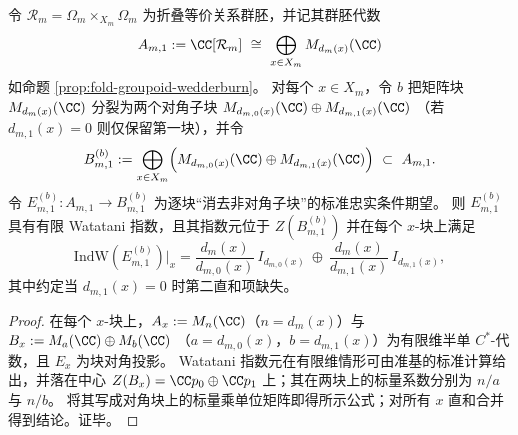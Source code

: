 \begin{proposition}\label{prop:pom-hiddenbit-watatani-index-element}
令 \(\mathcal{R}_m=\Omega_m\times_{X_m}\Omega_m\) 为折叠等价关系群胚，并记其群胚代数
\[
A_{m,1}:=\CC[\mathcal{R}_m]\ \cong\ \bigoplus_{x\in X_m}M_{d_m(x)}(\CC)
\]
如命题 \ref{prop:fold-groupoid-wedderburn}。
对每个 \(x\in X_m\)，令 \(b\) 把矩阵块 \(M_{d_m(x)}(\CC)\) 分裂为两个对角子块
\(
M_{d_{m,0}(x)}(\CC)\oplus M_{d_{m,1}(x)}(\CC)
\)
（若 \(d_{m,1}(x)=0\) 则仅保留第一块），并令
\[
B_{m,1}^{(b)}:=\bigoplus_{x\in X_m}\Bigl(M_{d_{m,0}(x)}(\CC)\oplus M_{d_{m,1}(x)}(\CC)\Bigr)\ \subset\ A_{m,1}.
\]
令 \(E_{m,1}^{(b)}:A_{m,1}\to B_{m,1}^{(b)}\) 为逐块“消去非对角子块”的标准忠实条件期望。
则 \(E_{m,1}^{(b)}\) 具有有限 Watatani 指数，且其指数元位于 \(Z(B_{m,1}^{(b)})\) 并在每个 \(x\)-块上满足
\[
\mathrm{IndW}\!\left(E_{m,1}^{(b)}\right)\Big|_{x}
=
\frac{d_m(x)}{d_{m,0}(x)}\,I_{d_{m,0}(x)}
\ \oplus\
\frac{d_m(x)}{d_{m,1}(x)}\,I_{d_{m,1}(x)},
\]
其中约定当 \(d_{m,1}(x)=0\) 时第二直和项缺失。
\end{proposition}
\begin{proof}
在每个 \(x\)-块上，\(A_x:=M_{n}(\CC)\)（\(n=d_m(x)\)）与
\(
B_x:=M_{a}(\CC)\oplus M_{b}(\CC)
\)
（\(a=d_{m,0}(x)\)，\(b=d_{m,1}(x)\)）为有限维半单 \(C^\ast\)-代数，且 \(E_x\) 为块对角投影。
Watatani 指数元在有限维情形可由准基的标准计算给出，并落在中心 \(Z(B_x)=\CC p_0\oplus\CC p_1\) 上；其在两块上的标量系数分别为 \(n/a\) 与 \(n/b\)。
将其写成对角块上的标量乘单位矩阵即得所示公式；对所有 \(x\) 直和合并得到结论。证毕。
\end{proof}

